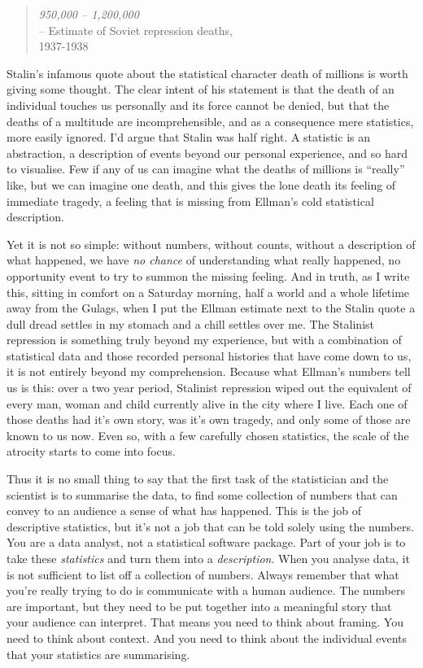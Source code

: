 \begin{quote}
{\it 950,000 -- 1,200,000} \\
\hspace*{2cm} -- Estimate of Soviet repression deaths, \\ \hspace*{2.3cm} 1937-1938 \parencite{Ellman2002}
\end{quote}


Stalin's infamous quote about the statistical character death of millions is worth giving some thought. The clear intent of his statement is that the death of an individual touches us personally and its force cannot be denied, but that the deaths of a multitude are incomprehensible, and as a consequence mere statistics, more easily ignored. I'd argue that Stalin was half right. A statistic is an abstraction, a description of events beyond our personal experience, and so hard to visualise. Few if any of us can imagine what the deaths of millions is ``really'' like, but we can imagine one death, and this gives the lone death its feeling of immediate tragedy, a feeling that is missing from Ellman's cold statistical description.

Yet it is not so simple: without numbers, without counts, without a description of what happened, we have {\it no chance} of understanding what really happened, no opportunity event to try to summon the missing feeling. And in truth, as I write this, sitting in comfort on a Saturday morning, half a world and a whole lifetime away from the Gulags, when I put the Ellman estimate next to the Stalin quote a dull dread settles in my stomach and a chill settles over me. The Stalinist repression is something truly beyond my experience, but with a combination of statistical data and those recorded personal histories that have come down to us, it is not entirely beyond my comprehension. Because what Ellman's numbers tell us is this: over a two year period, Stalinist repression wiped out the equivalent of every man, woman and child currently alive in the city where I live. Each one of those deaths had it's own story, was it's own tragedy, and only some of those are known to us now. Even so, with a few carefully chosen statistics, the scale of the atrocity starts to come into focus.  

Thus it is no small thing to say that the first task of the statistician and the scientist is to summarise the data, to find some collection of numbers that can convey to an audience a sense of what has happened. This is the job of descriptive statistics, but it's not a job that can be told solely using the numbers. You are a data analyst, not a statistical software package. Part of your job is to take these {\it statistics} and turn them into a {\it description}. When you analyse data, it is not sufficient to list off a collection of numbers. Always remember that what you're really trying to do is communicate with a human audience. The numbers are important, but they need to be put together into a meaningful story that your audience can interpret. That means you need to think about framing. You need to think about context. And you need to think about the individual events that your statistics are summarising. 


